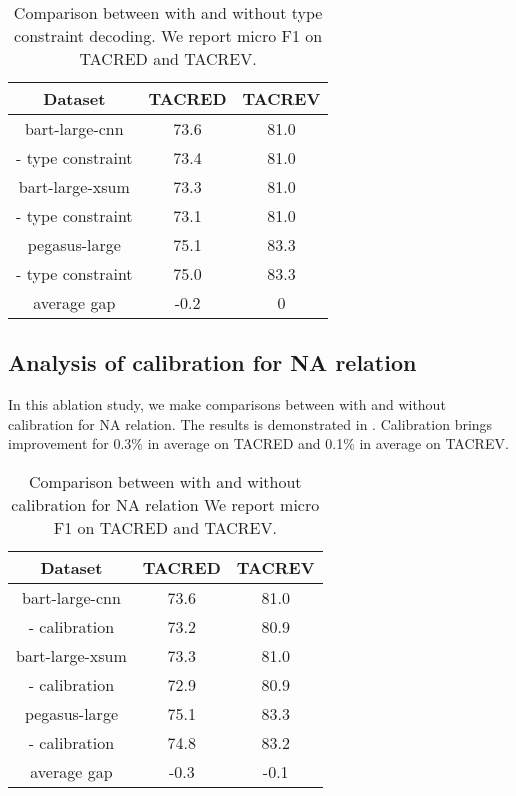 \begin{table}[h]
    \centering
    \begin{threeparttable}
    \small
    \begin{tabular}{ccc}
    \toprule
    Dataset & TACRED & TACREV\\
    \midrule
    bart-large-cnn & 73.6 & 81.0 \\
    - type constraint & 73.4 & 81.0 \\
    \midrule
    bart-large-xsum & 73.3 & 81.0 \\
    - type constraint & 73.1 & 81.0 \\
    \midrule
    pegasus-large & 75.1 & 83.3 \\
    - type constraint & 75.0 & 83.3\\
    \midrule
    average gap & -0.2 & 0\\
    \bottomrule
    \end{tabular}
    \end{threeparttable}
    \caption{Comparison between \modelname with and without type constraint decoding. We report micro F1 on TACRED and TACREV.}
    \label{tab:result-type-constraint}
\end{table}

\subsection{Analysis of calibration for NA relation} \label{ssec:analysis_of_calibration}

In this ablation study, we make comparisons between \modelname with and without calibration for NA relation. The results is demonstrated in . Calibration brings improvement for 0.3\% in average on TACRED and 0.1\% in average on TACREV.

\begin{table}[h]
    \centering
    \begin{threeparttable}
    \small
    \begin{tabular}{ccc}
    \toprule
    Dataset & TACRED & TACREV \\
    \midrule
    bart-large-cnn & 73.6 & 81.0 \\
    - calibration & 73.2 & 80.9 \\
    \midrule
    bart-large-xsum & 73.3 & 81.0 \\
    - calibration & 72.9  & 80.9 \\
    \midrule
    pegasus-large & 75.1 & 83.3\\
    - calibration & 74.8 & 83.2\\
    \midrule
    average gap &  -0.3 & -0.1 \\
    \bottomrule
    \end{tabular}
    \end{threeparttable}
    \caption{Comparison between \modelname with and without calibration for NA relation We report micro F1 on TACRED and TACREV.}
    \label{tab:analysis_of_calibration}
\end{table}


